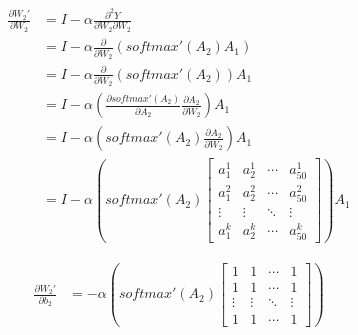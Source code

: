 \documentclass[12pt,a4paper]{amsart}
\begin{document}
\begin{equation}
	\begin{aligned}
		\frac{\partial {W_2}'}{\partial W_2} & = I - \alpha \frac{\partial^2 Y}{\partial W_2 \partial W_2}                                                   \\
		                                     & = I - \alpha \frac{\partial}{\partial W_2} \left( softmax'(A_2) A_1 \right)                                   \\
		                                     & = I - \alpha \frac{\partial}{\partial W_2} \left( softmax'(A_2) \right) A_1                                   \\
		                                     & = I - \alpha \left( \frac{\partial softmax'(A_2)}{\partial A_2} \frac{\partial A_2}{\partial W_2} \right) A_1 \\
		                                     & = I - \alpha \left( softmax'(A_2) \frac{\partial A_2}{\partial W_2} \right) A_1                               \\
		                                     & = I - \alpha \left( softmax'(A_2) \begin{bmatrix}
			a_1^1  & a_2^1  & \cdots & a_{50}^1 \\
			a_1^2  & a_2^2  & \cdots & a_{50}^2 \\
			\vdots & \vdots & \ddots & \vdots   \\
			a_1^k  & a_2^k  & \cdots & a_{50}^k
		\end{bmatrix} \right) A_1
	\end{aligned}
\end{equation}

\begin{equation}
	\begin{aligned}
		\frac{\partial {W_2}'}{\partial b_2} & = - \alpha \left( softmax'(A_2) \begin{bmatrix}
			1      & 1      & \cdots & 1      \\
			1      & 1      & \cdots & 1      \\
			\vdots & \vdots & \ddots & \vdots \\
			1      & 1      & \cdots & 1
		\end{bmatrix} \right)
	\end{aligned}
\end{equation}
\end{document}
